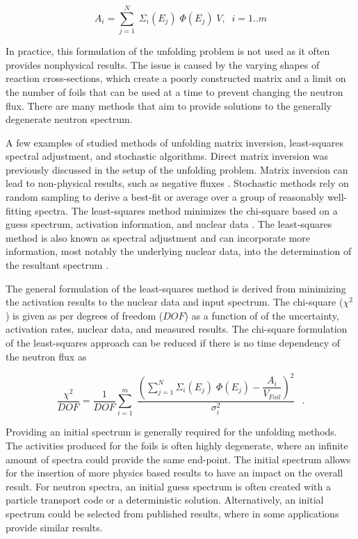 \begin{equation} \label{eq:BadWaytoGetFlux}
    A_{i}= \sum_{j=1}^{N} \; \Sigma_{i}(E_{j}) \;\Phi(E_{j}) \;V,\;\; 
    i=1..m 
\end{equation}

\noindent In practice, this formulation of the unfolding problem is not used as it often provides nonphysical results.
The issue is caused by the varying shapes of reaction cross-sections, which create a poorly constructed matrix and a limit on the number of foils that can be used at a time to prevent changing the neutron flux. 
There are many methods that aim to provide solutions to the generally degenerate neutron spectrum. 

A few examples of studied methods of unfolding matrix inversion, least-squares spectral adjustment, and stochastic algorithms\cite{Reginatto2010}. 
Direct matrix inversion was previously discussed in the setup of the unfolding problem. 
Matrix inversion can lead to non-physical results, such as negative fluxes \cite{Reginatto2010}. 
Stochastic methods rely on random sampling to derive a best-fit or average over a group of reasonably well-fitting spectra\cite{Reginatto2010}. 
The least-squares method minimizes the chi-square based on a guess spectrum, activation information, and nuclear data \cite{Perey1977}.
The least-squares method is also known as spectral adjustment and can incorporate more information, most notably the underlying nuclear data, into the determination of the resultant spectrum \cite{Perey1977}.  

The general formulation of the least-squares method is derived from minimizing the activation results to the nuclear data and input spectrum\cite{Perey1977}. 
The chi-square ($\chi^{2}$) is given as per degrees of freedom ($DOF$) as a function of of the uncertainty, activation rates, nuclear data, and measured results. 
The chi-square formulation of the least-squares approach can be reduced if there is no time dependency of the neutron flux as

\begin{equation} \label{eq:LeastSq}
\dfrac{\chi^2}{DOF}= \dfrac{1}{DOF}\sum_{i=1}^{m} \; \dfrac{(\sum_{j=1}^{N} \Sigma_{i}(E_{j}) \;\Phi(E_{j})-\dfrac{A_{i}}{V_{Foil}})^{2}}{\sigma_{i}^{2}} \,\;\; .
\end{equation}

Providing an initial spectrum is generally required for the unfolding methods. 
The activities produced for the foils is often highly degenerate, where an infinite amount of spectra could provide the same end-point. 
The initial spectrum allows for the insertion of more physics based results to have an impact on the overall result. 
For neutron spectra, an initial guess spectrum is often created with a particle transport code or a deterministic solution. 
Alternatively, an initial spectrum could be selected from published results, where in some applications provide similar results\cite{VegaCarrillo2002}. 

